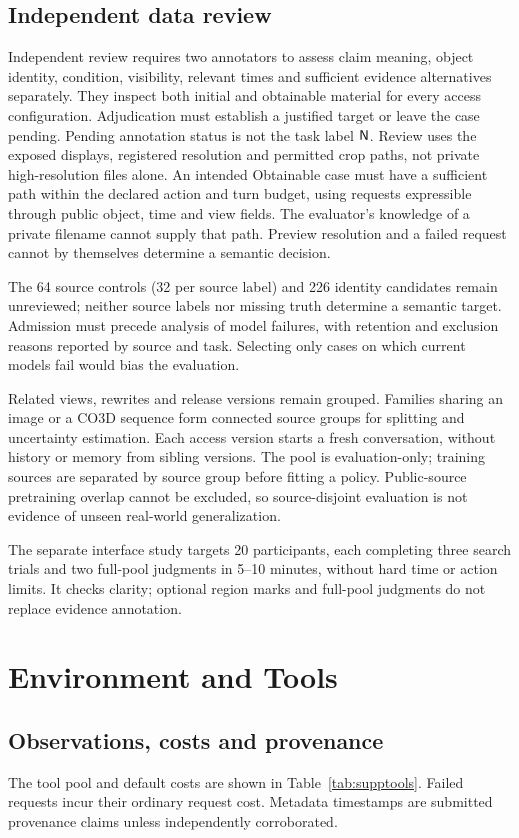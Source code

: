 \subsection{Independent data review}
Independent review requires two annotators to assess claim meaning, object identity, condition, visibility, relevant times and sufficient evidence alternatives separately.
They inspect both initial and obtainable material for every access configuration.
Adjudication must establish a justified target or leave the case pending. Pending annotation status is not the task label \(\mathsf{N}\). Review uses the exposed displays, registered resolution and permitted crop paths, not private high-resolution files alone.
An intended Obtainable case must have a sufficient path within the declared action and turn budget, using requests expressible through public object, time and view fields. The evaluator's knowledge of a private filename cannot supply that path.
Preview resolution and a failed request cannot by themselves determine a semantic decision.

The 64 source controls (32 per source label) and 226 identity candidates remain unreviewed; neither source labels nor missing truth determine a semantic target. Admission must precede analysis of model failures, with retention and exclusion reasons reported by source and task. Selecting only cases on which current models fail would bias the evaluation.

Related views, rewrites and release versions remain grouped.
Families sharing an image or a CO3D sequence form connected source groups for splitting and uncertainty estimation.
Each access version starts a fresh conversation, without history or memory from sibling versions. The pool is evaluation-only; training sources are separated by source group before fitting a policy. Public-source pretraining overlap cannot be excluded, so source-disjoint evaluation is not evidence of unseen real-world generalization.

The separate interface study targets 20 participants, each completing three search trials and two full-pool judgments in 5--10 minutes, without hard time or action limits. It checks clarity; optional region marks and full-pool judgments do not replace evidence annotation.

\section{Environment and Tools}
\subsection{Observations, costs and provenance}
The tool pool and default costs are shown in Table~\ref{tab:supptools}.
Failed requests incur their ordinary request cost.
Metadata timestamps are submitted provenance claims unless independently corroborated.


